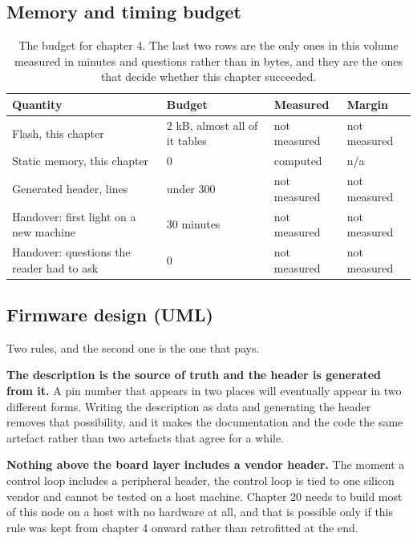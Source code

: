 \subsection*{Memory and timing budget}

\begin{table}[H]\centering\small
\begin{tabular}{p{44mm}p{28mm}p{28mm}p{30mm}}
\toprule
Quantity & Budget & Measured & Margin \\
\midrule
Flash, this chapter & 2 kB, almost all of it tables & not measured & not measured \\
Static memory, this chapter & 0 & computed & n/a \\
Generated header, lines & under 300 & not measured & not measured \\
Handover: first light on a new machine & 30 minutes & not measured & not measured \\
Handover: questions the reader had to ask & 0 & not measured & not measured \\
\bottomrule
\end{tabular}
\caption{The budget for chapter 4. The last two rows are the only ones in this volume measured in minutes and questions rather than in bytes, and they are the ones that decide whether this chapter succeeded.}
\end{table}

\subsection*{Firmware design (UML)}


Two rules, and the second one is the one that pays.

\textbf{The description is the source of truth and the header is generated from
it.} A pin number that appears in two places will eventually appear in two
different forms. Writing the description as data and generating the header
removes that possibility, and it makes the documentation and the code the same
artefact rather than two artefacts that agree for a while.

\textbf{Nothing above the board layer includes a vendor header.} The moment a
control loop includes a peripheral header, the control loop is tied to one
silicon vendor and cannot be tested on a host machine. Chapter 20 needs to build
most of this node on a host with no hardware at all, and that is possible only
if this rule was kept from chapter 4 onward rather than retrofitted at the end.

